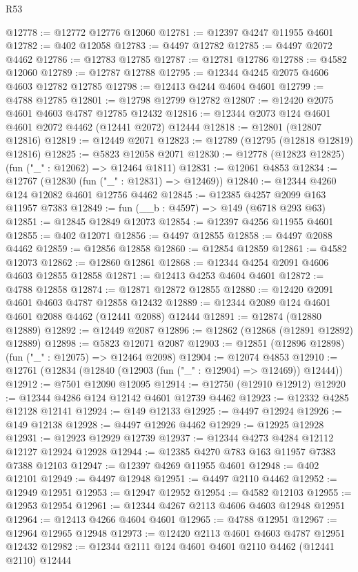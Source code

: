 \begin{lexlean}{R53}
\begin{coremodule}
@12778 := @12772 @12776 @12060
@12781 := @12397 @4247 @11955 @4601
@12782 := @402 @12058
@12783 := @4497 @12782
@12785 := @4497 @2072 @4462
@12786 := @12783 @12785
@12787 := @12781 @12786
@12788 := @4582 @12060
@12789 := @12787 @12788
@12795 := @12344 @4245 @2075 @4606 @4603 @12782 @12785
@12798 := @12413 @4244 @4604 @4601
@12799 := @4788 @12785
@12801 := @12798 @12799 @12782
@12807 := @12420 @2075 @4601 @4603 @4787 @12785 @12432
@12816 := @12344 @2073 @124 @4601 @4601 @2072 @4462 (@12441 @2072) @12444
@12818 := @12801 (@12807 @12816)
@12819 := @12449 @2071
@12823 := @12789 (@12795 (@12818 @12819) @12816)
@12825 := @5823 @12058 @2071
@12830 := @12778 (@12823 @12825) (fun ("_" : @12062) => @12464 @1811)
@12831 := @12061 @4853
@12834 := @12767 (@12830 (fun ("_" : @12831) => @12469))
@12840 := @12344 @4260 @124 @12082 @4601 @12756 @4462
@12845 := @12385 @4257 @2099 @163 @11957 @7383
@12849 := fun (__b : @4597) => @149 (@6718 @293 @63)
@12851 := @12845 @12849 @12073
@12854 := @12397 @4256 @11955 @4601
@12855 := @402 @12071
@12856 := @4497 @12855
@12858 := @4497 @2088 @4462
@12859 := @12856 @12858
@12860 := @12854 @12859
@12861 := @4582 @12073
@12862 := @12860 @12861
@12868 := @12344 @4254 @2091 @4606 @4603 @12855 @12858
@12871 := @12413 @4253 @4604 @4601
@12872 := @4788 @12858
@12874 := @12871 @12872 @12855
@12880 := @12420 @2091 @4601 @4603 @4787 @12858 @12432
@12889 := @12344 @2089 @124 @4601 @4601 @2088 @4462 (@12441 @2088) @12444
@12891 := @12874 (@12880 @12889)
@12892 := @12449 @2087
@12896 := @12862 (@12868 (@12891 @12892) @12889)
@12898 := @5823 @12071 @2087
@12903 := @12851 (@12896 @12898) (fun ("_" : @12075) => @12464 @2098)
@12904 := @12074 @4853
@12910 := @12761 (@12834 (@12840 (@12903 (fun ("_" : @12904) => @12469)) @12444))
@12912 := @7501 @12090 @12095
@12914 := @12750 (@12910 @12912)
@12920 := @12344 @4286 @124 @12142 @4601 @12739 @4462
@12923 := @12332 @4285 @12128 @12141
@12924 := @149 @12133
@12925 := @4497 @12924
@12926 := @149 @12138
@12928 := @4497 @12926 @4462
@12929 := @12925 @12928
@12931 := @12923 @12929 @12739
@12937 := @12344 @4273 @4284 @12112 @12127 @12924 @12928
@12944 := @12385 @4270 @783 @163 @11957 @7383 @7388 @12103
@12947 := @12397 @4269 @11955 @4601
@12948 := @402 @12101
@12949 := @4497 @12948
@12951 := @4497 @2110 @4462
@12952 := @12949 @12951
@12953 := @12947 @12952
@12954 := @4582 @12103
@12955 := @12953 @12954
@12961 := @12344 @4267 @2113 @4606 @4603 @12948 @12951
@12964 := @12413 @4266 @4604 @4601
@12965 := @4788 @12951
@12967 := @12964 @12965 @12948
@12973 := @12420 @2113 @4601 @4603 @4787 @12951 @12432
@12982 := @12344 @2111 @124 @4601 @4601 @2110 @4462 (@12441 @2110) @12444

\end{coremodule}
\end{lexlean}
